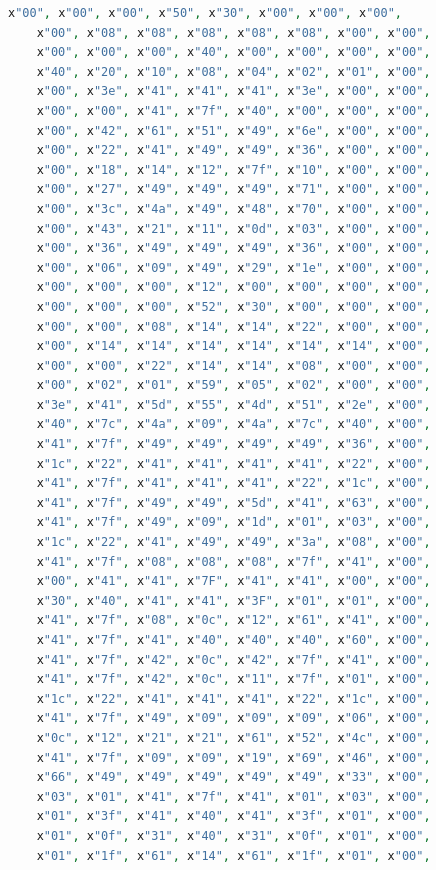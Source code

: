\documentclass[a4paper,12pt]{article}
\begin{document}
\begin{lstlisting}[language=VHDL,basicstyle=\ttfamily\small,frame=single,caption={ascii\_rom.vhd}]
    x"00", x"00", x"00", x"50", x"30", x"00", x"00", x"00",
    x"00", x"08", x"08", x"08", x"08", x"08", x"00", x"00",
    x"00", x"00", x"00", x"40", x"00", x"00", x"00", x"00",
    x"40", x"20", x"10", x"08", x"04", x"02", x"01", x"00",
    x"00", x"3e", x"41", x"41", x"41", x"3e", x"00", x"00",
    x"00", x"00", x"41", x"7f", x"40", x"00", x"00", x"00",
    x"00", x"42", x"61", x"51", x"49", x"6e", x"00", x"00",
    x"00", x"22", x"41", x"49", x"49", x"36", x"00", x"00",
    x"00", x"18", x"14", x"12", x"7f", x"10", x"00", x"00",
    x"00", x"27", x"49", x"49", x"49", x"71", x"00", x"00",
    x"00", x"3c", x"4a", x"49", x"48", x"70", x"00", x"00",
    x"00", x"43", x"21", x"11", x"0d", x"03", x"00", x"00",
    x"00", x"36", x"49", x"49", x"49", x"36", x"00", x"00",
    x"00", x"06", x"09", x"49", x"29", x"1e", x"00", x"00",
    x"00", x"00", x"00", x"12", x"00", x"00", x"00", x"00",
    x"00", x"00", x"00", x"52", x"30", x"00", x"00", x"00",
    x"00", x"00", x"08", x"14", x"14", x"22", x"00", x"00",
    x"00", x"14", x"14", x"14", x"14", x"14", x"14", x"00",
    x"00", x"00", x"22", x"14", x"14", x"08", x"00", x"00",
    x"00", x"02", x"01", x"59", x"05", x"02", x"00", x"00",
    x"3e", x"41", x"5d", x"55", x"4d", x"51", x"2e", x"00",
    x"40", x"7c", x"4a", x"09", x"4a", x"7c", x"40", x"00",
    x"41", x"7f", x"49", x"49", x"49", x"49", x"36", x"00",
    x"1c", x"22", x"41", x"41", x"41", x"41", x"22", x"00",
    x"41", x"7f", x"41", x"41", x"41", x"22", x"1c", x"00",
    x"41", x"7f", x"49", x"49", x"5d", x"41", x"63", x"00",
    x"41", x"7f", x"49", x"09", x"1d", x"01", x"03", x"00",
    x"1c", x"22", x"41", x"49", x"49", x"3a", x"08", x"00",
    x"41", x"7f", x"08", x"08", x"08", x"7f", x"41", x"00",
    x"00", x"41", x"41", x"7F", x"41", x"41", x"00", x"00",
    x"30", x"40", x"41", x"41", x"3F", x"01", x"01", x"00",
    x"41", x"7f", x"08", x"0c", x"12", x"61", x"41", x"00",
    x"41", x"7f", x"41", x"40", x"40", x"40", x"60", x"00",
    x"41", x"7f", x"42", x"0c", x"42", x"7f", x"41", x"00",
    x"41", x"7f", x"42", x"0c", x"11", x"7f", x"01", x"00",
    x"1c", x"22", x"41", x"41", x"41", x"22", x"1c", x"00",
    x"41", x"7f", x"49", x"09", x"09", x"09", x"06", x"00",
    x"0c", x"12", x"21", x"21", x"61", x"52", x"4c", x"00",
    x"41", x"7f", x"09", x"09", x"19", x"69", x"46", x"00",
    x"66", x"49", x"49", x"49", x"49", x"49", x"33", x"00",
    x"03", x"01", x"41", x"7f", x"41", x"01", x"03", x"00",
    x"01", x"3f", x"41", x"40", x"41", x"3f", x"01", x"00",
    x"01", x"0f", x"31", x"40", x"31", x"0f", x"01", x"00",
    x"01", x"1f", x"61", x"14", x"61", x"1f", x"01", x"00",

\end{lstlisting}
\end{document}
